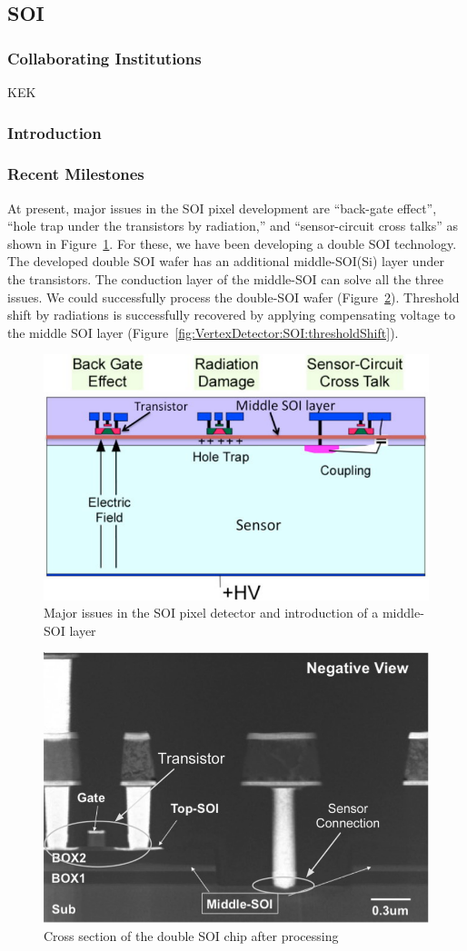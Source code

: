 \subsection{SOI}
\subsubsection{Collaborating Institutions}
KEK
\subsubsection{Introduction}
\subsubsection{Recent Milestones}
At present, major issues in the SOI pixel development are ``back-gate effect'', ``hole trap under the transistors by radiation,'' and ``sensor-circuit cross talks'' as shown in Figure~\ref{fig:VertexDetector:SOI:SOI_Schematic}. For these, we have been developing a double SOI technology. The developed double SOI wafer has an additional middle-SOI(Si) layer under the transistors. The conduction layer of the middle-SOI can solve all the three issues. We could successfully process the double-SOI wafer (Figure~\ref{fig:VertexDetector:SOI:crossSectionAfterProcessing}). Threshold shift by radiations is successfully recovered by applying compensating voltage to the middle SOI layer (Figure~\ref{fig:VertexDetector:SOI:thresholdShift}).

\begin{figure}
\centering
\includegraphics[width=.5\textwidth]{VertexDetector/SOI/SOI_Schematic}
\caption{Major issues in the SOI pixel detector and introduction of a middle-SOI layer}
\label{fig:VertexDetector:SOI:SOI_Schematic}
\end{figure}

\begin{figure}
\centering
\includegraphics[width=.5\textwidth]{VertexDetector/SOI/crossSectionAfterProcessing}
\caption{Cross section of the double SOI chip after processing}
\label{fig:VertexDetector:SOI:crossSectionAfterProcessing}
\end{figure}

